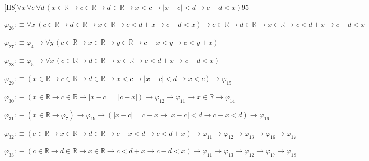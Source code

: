 \begin{fullproof}{[H8]}{$\forall x\,\forall c\,\forall d\,(x \in \mathbb{R} \to c \in \mathbb{R} \to d \in \mathbb{R} \to x < c \to \lvert x - c \rvert < d \to c - d < x)$}{95}
\begin{abbrevlist}
\item $\varphi_{26} :\equiv \forall x\,(c \in \mathbb{R} \to d \in \mathbb{R} \to x \in \mathbb{R} \to c < d + x \to c - d < x) \to c \in \mathbb{R} \to d \in \mathbb{R} \to x \in \mathbb{R} \to c < d + x \to c - d < x$
\item $\varphi_{27} :\equiv \varphi_{4} \to \forall y\,(c \in \mathbb{R} \to x \in \mathbb{R} \to y \in \mathbb{R} \to c - x < y \to c < y + x)$
\item $\varphi_{28} :\equiv \varphi_{5} \to \forall x\,(c \in \mathbb{R} \to d \in \mathbb{R} \to x \in \mathbb{R} \to c < d + x \to c - d < x)$
\item $\varphi_{29} :\equiv (x \in \mathbb{R} \to c \in \mathbb{R} \to d \in \mathbb{R} \to x < c \to \lvert x - c \rvert < d \to x < c) \to \varphi_{15}$
\item $\varphi_{30} :\equiv (x \in \mathbb{R} \to c \in \mathbb{R} \to \lvert x - c \rvert = \lvert c - x \rvert) \to \varphi_{12} \to \varphi_{11} \to x \in \mathbb{R} \to \varphi_{14}$
\item $\varphi_{31} :\equiv (x \in \mathbb{R} \to \varphi_{7}) \to \varphi_{19} \to (\lvert x - c \rvert = c - x \to \lvert x - c \rvert < d \to c - x < d) \to \varphi_{16}$
\item $\varphi_{32} :\equiv (c \in \mathbb{R} \to x \in \mathbb{R} \to d \in \mathbb{R} \to c - x < d \to c < d + x) \to \varphi_{11} \to \varphi_{12} \to \varphi_{13} \to \varphi_{16} \to \varphi_{17}$
\item $\varphi_{33} :\equiv (c \in \mathbb{R} \to d \in \mathbb{R} \to x \in \mathbb{R} \to c < d + x \to c - d < x) \to \varphi_{11} \to \varphi_{13} \to \varphi_{12} \to \varphi_{17} \to \varphi_{18}$
\end{abbrevlist}
\end{fullproof}
